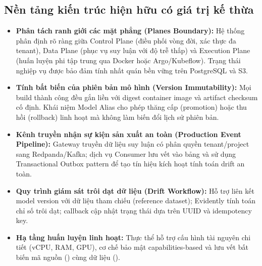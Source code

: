 \subsection{Nền tảng kiến trúc hiện hữu có giá trị kế thừa}
\begin{itemize}
  \item \textbf{Phân tách ranh giới các mặt phẳng (Planes Boundary):} Hệ thống phân định rõ ràng giữa Control Plane (điều phối vòng đời, xác thực đa tenant), Data Plane (phục vụ suy luận với độ trễ thấp) và Execution Plane (huấn luyện phi tập trung qua Docker hoặc Argo/Kubeflow). Trạng thái nghiệp vụ được bảo đảm tính nhất quán bền vững trên PostgreSQL và S3.
  \item \textbf{Tính bất biến của phiên bản mô hình (Version Immutability):} Mọi build thành công đều gắn liền với digest container image và artifact checksum cố định. Khái niệm Model Alias cho phép thăng cấp (promotion) hoặc thu hồi (rollback) linh hoạt mà không làm biến đổi lịch sử phiên bản.
  \item \textbf{Kênh truyền nhận sự kiện sản xuất an toàn (Production Event Pipeline):} Gateway truyền dữ liệu suy luận có phân quyền tenant/project sang Redpanda/Kafka; dịch vụ Consumer lưu vết vào bảng  và sử dụng Transactional Outbox pattern để tạo tín hiệu kích hoạt tính toán drift an toàn.
  \item \textbf{Quy trình giám sát trôi dạt dữ liệu (Drift Workflow):} Hỗ trợ liên kết model version với dữ liệu tham chiếu (reference dataset); Evidently tính toán chỉ số trôi dạt; callback cập nhật trạng thái  dựa trên UUID và idempotency key.
  \item \textbf{Hạ tầng huấn luyện linh hoạt:} Thực thể  hỗ trợ cấu hình tài nguyên chi tiết (vCPU, RAM, GPU), cơ chế bảo mật capabilities-based và lưu vết bất biến mã nguồn () cùng dữ liệu ().
\end{itemize}

